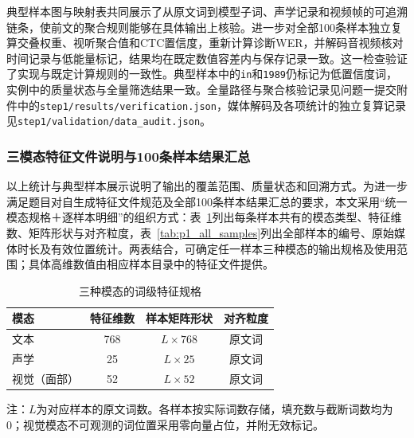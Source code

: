 典型样本图与映射表共同展示了从原文词到模型子词、声学记录和视频帧的可追溯链条，使前文的聚合规则能够在具体输出上核验。进一步对全部100条样本独立复算交叠权重、视听聚合值和CTC置信度，重新计算诊断WER，并解码音视频核对时间记录与低能量标记，结果均在既定数值容差内与保存记录一致。这一检查验证了实现与既定计算规则的一致性。典型样本中的\texttt{in}和\texttt{1989}仍标记为低置信度词，实例中的质量状态与全量筛选结果一致。全量路径与聚合核验记录见问题一提交附件中的\nolinkurl{step1/results/verification.json}，媒体解码及各项统计的独立复算记录见\nolinkurl{step1/validation/data_audit.json}。

\subsubsection{三模态特征文件说明与100条样本结果汇总}
\label{sec:p1_delivery}

以上统计与典型样本展示说明了输出的覆盖范围、质量状态和回溯方式。为进一步满足题目对自生成特征文件规范及全部100条样本结果汇总的要求，本文采用“统一模态规格＋逐样本明细”的组织方式：表~\ref{tab:p1_feature_specification}列出每条样本共有的模态类型、特征维数、矩阵形状与对齐粒度，表~\ref{tab:p1_all_samples}列出全部样本的编号、原始媒体时长及有效位置统计。两表结合，可确定任一样本三种模态的输出规格及使用范围；具体高维数值由相应样本目录中的特征文件提供。

\begin{table}[H]
    \centering\small
    \caption{三种模态的词级特征规格}
    \label{tab:p1_feature_specification}
    \setlength{\tabcolsep}{6pt}
    \renewcommand{\arraystretch}{1.12}
    \ifdefined\pOneCompactTableBox\else\newsavebox{\pOneCompactTableBox}\fi
    \begin{lrbox}{\pOneCompactTableBox}
    \begin{tabular}{lccc}
        \toprule
        模态 & 特征维数 & 样本矩阵形状 & 对齐粒度\\
        \midrule
        文本 & 768 & $L\times768$ & 原文词\\
        声学 & 25 & $L\times25$ & 原文词\\
        视觉（面部） & 52 & $L\times52$ & 原文词\\
        \bottomrule
    \end{tabular}
    \end{lrbox}
    \usebox{\pOneCompactTableBox}
\par\smallskip
\parbox{\wd\pOneCompactTableBox}{\footnotesize 注：$L$为对应样本的原文词数。各样本按实际词数存储，填充数与截断词数均为0；视觉模态不可观测的词位置采用零向量占位，并附无效标记。}
\end{table}

